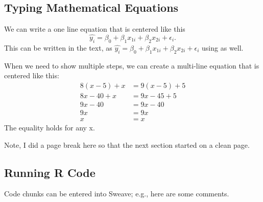 \documentclass{article}\usepackage[]{graphicx}\usepackage[]{xcolor}
\begin{document}
\begin{multicols}{2}
\subsection{Typing Mathematical Equations}
We can write a one line equation that is centered like this
  \[\widehat{y_i} = \beta_0 + \beta_1 x_{1i}+ \beta_2 x_{2i} + \epsilon_i.\]
This can be written in the text, as $\widehat{y_i} = \beta_0 + \beta_1 x_{1i}+ \beta_2 x_{2i} + \epsilon_i$ using as well.

When we need to show multiple steps, we can create a multi-line equation that is centered like this:
\begin{align*}
 8(x-5)+x&=9(x-5)+5\\
 8x-40+x&=9x-45+5 \tag{Distributing} \\
 9x-40&=9x-40 \tag{Combining like terms} \\
 9x&=9x \tag{Adding 40 to both sides} \\
 x&=x \tag{Dividing both sides by 9} 
 \end{align*}
The equality holds for any x.

Note, I did a page break here so that the next section
started on a clean page.
\pagebreak


\subsection{Running R Code}
Code chunks can be entered into Sweave; e.g., here are some comments.


\end{multicols}
\end{document}

